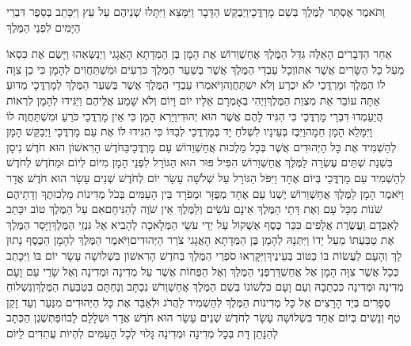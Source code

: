 \documentclass[../main/main.tex]{subfiles}
\begin{document}
\begin{multicols}{\ncols}
וַתֹּאמֶר אֶסְתֵּר לַמֶּלֶךְ בְּשֵׁם מָרְדֳּכָי\PreVerseSpace{}וַיְבֻקַּשׁ הַדָּבָר וַיִּמָּצֵא וַיִּתָּלוּ שְׁנֵיהֶם עַל עֵץ וַיִּכָּתֵב בְּסֵפֶר דִּבְרֵי הַיָּמִים לִפְנֵי הַמֶּלֶךְ\OpenSection{}\par
{}אַחַר הַדְּבָרִים הָאֵלֶּה גִּדַּל הַמֶּלֶךְ אֲחַשְׁוֵרוֹשׁ אֶת הָמָן בֶּן הַמְּדָתָא הָאֲגָגִי וַיְנַשְּׂאֵהוּ וַיָּשֶׂם אֶת כִּסְאוֹ מֵעַל כָּל הַשָּׂרִים אֲשֶׁר אִתּוֹ\PreVerseSpace{}וְכָל עַבְדֵי הַמֶּלֶךְ אֲשֶׁר בְּשַׁעַר הַמֶּלֶךְ כֹּרְעִים וּמִשְׁתַּחֲוִים לְהָמָן כִּי כֵן צִוָּה לוֹ הַמֶּלֶךְ וּמָרְדֳּכַי לֹא יִכְרַע וְלֹא יִשְׁתַּחֲוֶה\PreVerseSpace{}וַיֹּאמְרוּ עַבְדֵי הַמֶּלֶךְ אֲשֶׁר בְּשַׁעַר הַמֶּלֶךְ לְמָרְדֳּכָי מַדּוּעַ אַתָּה עוֹבֵר אֵת מִצְוַת הַמֶּלֶךְ\PreVerseSpace{}וַיְהִי בְּאָמְרָם אֵלָיו יוֹם וָיוֹם וְלֹא שָׁמַע אֲלֵיהֶם וַיַּגִּידוּ לְהָמָן לִרְאוֹת הֲיַעַמְדוּ דִּבְרֵי מָרְדֳּכַי כִּי הִגִּיד לָהֶם אֲשֶׁר הוּא יְהוּדִי\PreVerseSpace{}וַיַּרְא הָמָן כִּי אֵין מָרְדֳּכַי כֹּרֵעַ וּמִשְׁתַּחֲוֶה לוֹ וַיִּמָּלֵא הָמָן חֵמָה\PreVerseSpace{}וַיִּבֶז בְּעֵינָיו לִשְׁלֹחַ יָד בְּמָרְדֳּכַי לְבַדּוֹ כִּי הִגִּידוּ לוֹ אֶת עַם מָרְדֳּכָי וַיְבַקֵּשׁ הָמָן לְהַשְׁמִיד אֶת כָּל הַיְּהוּדִים אֲשֶׁר בְּכָל מַלְכוּת אֲחַשְׁוֵרוֹשׁ עַם מָרְדֳּכָי\PreVerseSpace{}בַּחֹדֶשׁ הָרִאשׁוֹן הוּא חֹדֶשׁ נִיסָן בִּשְׁנַת שְׁתֵּים עֶשְׂרֵה לַמֶּלֶךְ אֲחַשְׁוֵרוֹשׁ הִפִּיל פּוּר הוּא הַגּוֹרָל לִפְנֵי הָמָן מִיּוֹם לְיוֹם וּמֵחֹדֶשׁ לְחֹדֶשׁ לְהַשְׁמִיד עַם מָרְדֳּכַי בְּיוֹם אֶחָד וַיִּפֹּל הַגּוֹרָל עַל שְׁלֹשָׁה עָשָׂר יוֹם לְחֹדֶשׁ\OmitEnd{} שְׁנֵים עָשָׂר הוּא חֹדֶשׁ אֲדָר \ClosedSection{}וַיֹּאמֶר הָמָן לַמֶּלֶךְ אֲחַשְׁוֵרוֹשׁ יֶשְׁנוֹ עַם אֶחָד מְפֻזָּר וּמְפֹרָד בֵּין הָעַמִּים בְּכֹל מְדִינוֹת מַלְכוּתֶךָ וְדָתֵיהֶם שֹׁנוֹת מִכָּל עָם וְאֶת דָּתֵי הַמֶּלֶךְ אֵינָם עֹשִׂים וְלַמֶּלֶךְ אֵין שֹׁוֶה לְהַנִּיחָם\PreVerseSpace{}אִם עַל הַמֶּלֶךְ טוֹב יִכָּתֵב לְאַבְּדָם וַעֲשֶׂרֶת אֲלָפִים כִּכַּר כֶּסֶף אֶשְׁקוֹל עַל יְדֵי עֹשֵׂי הַמְּלָאכָה לְהָבִיא אֶל גִּנְזֵי הַמֶּלֶךְ\PreVerseSpace{}וַיָּסַר הַמֶּלֶךְ אֶת טַבַּעְתּוֹ מֵעַל יָדוֹ וַיִּתְּנָהּ לְהָמָן בֶּן הַמְּדָתָא הָאֲגָגִי צֹרֵר הַיְּהוּדִים\PreVerseSpace{}וַיֹּאמֶר הַמֶּלֶךְ לְהָמָן הַכֶּסֶף נָתוּן לָךְ וְהָעָם לַעֲשׂוֹת בּוֹ כַּטּוֹב בְּעֵינֶיךָ\PreVerseSpace{}וַיִּקָּרְאוּ סֹפְרֵי הַמֶּלֶךְ בַּחֹדֶשׁ הָרִאשׁוֹן בִּשְׁלוֹשָׁה עָשָׂר יוֹם בּוֹ וַיִּכָּתֵב כְּכָל אֲשֶׁר צִוָּה הָמָן אֶל אֲחַשְׁדַּרְפְּנֵי הַמֶּלֶךְ וְאֶל הַפַּחוֹת אֲשֶׁר עַל מְדִינָה וּמְדִינָה וְאֶל שָׂרֵי עַם וָעָם מְדִינָה וּמְדִינָה כִּכְתָבָהּ וְעַם וָעָם כִּלְשׁוֹנוֹ בְּשֵׁם הַמֶּלֶךְ אֲחַשְׁוֵרֹשׁ נִכְתָּב וְנֶחְתָּם בְּטַבַּעַת הַמֶּלֶךְ\PreVerseSpace{}וְנִשְׁלוֹחַ סְפָרִים בְּיַד הָרָצִים אֶל כָּל מְדִינוֹת הַמֶּלֶךְ לְהַשְׁמִיד לַהֲרֹג וּלְאַבֵּד אֶת כָּל הַיְּהוּדִים מִנַּעַר וְעַד זָקֵן טַף וְנָשִׁים בְּיוֹם אֶחָד בִּשְׁלוֹשָׁה עָשָׂר לְחֹדֶשׁ שְׁנֵים עָשָׂר הוּא חֹדֶשׁ אֲדָר וּשְׁלָלָם לָבוֹז\PreVerseSpace{}פַּתְשֶׁגֶן הַכְּתָב לְהִנָּתֵן דָּת בְּכָל מְדִינָה וּמְדִינָה גָּלוּי לְכָל הָעַמִּים לִהְיוֹת עֲתִדִים לַיּוֹם 
\end{multicols}
\end{document}
